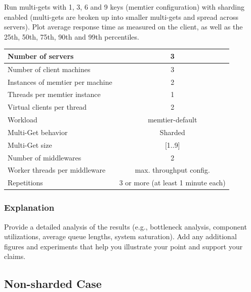\documentclass[11pt,a4paper]{article}
\begin{document}
Run multi-gets with 1, 3, 6 and 9 keys (memtier configuration) with sharding enabled (multi-gets are broken up into smaller multi-gets and spread across servers). Plot average response time as measured on the client, as well as the 25th, 50th, 75th, 90th and 99th percentiles.

\begin{center}
	\scriptsize{
		\begin{tabular}{|l|c|}
			\hline Number of servers                & 3                       \\ 
			\hline Number of client machines        & 3                       \\ 
			\hline Instances of memtier per machine & 2                       \\ 
			\hline Threads per memtier instance     & 1                       \\
			\hline Virtual clients per thread       & 2     		            \\ 
			\hline Workload                         & memtier-default             \\
			\hline Multi-Get behavior               & Sharded                 \\
			\hline Multi-Get size                   & [1..9]                  \\
			\hline Number of middlewares            & 2                       \\
			\hline Worker threads per middleware    & max. throughput config. \\
			\hline Repetitions                      & 3 or more (at least 1 minute each)               \\ 
			\hline 
		\end{tabular}
	} 
\end{center}

\subsubsection{Explanation}

Provide a detailed analysis of the results (e.g., bottleneck analysis, component utilizations, average queue lengths, system saturation). Add any additional figures and experiments that help you illustrate your point and support your claims.

\subsection{Non-sharded Case}
\end{document}
